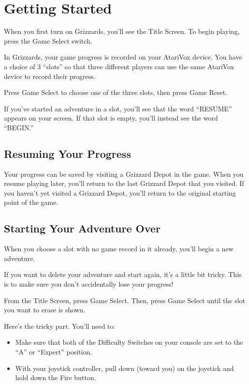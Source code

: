 \documentclass[12pt,twoside]{memoir}
\begin{document}
\chapter{Getting Started}\label{Getting Started}

When you first turn on Grizzards,  you'll see the Title Screen. To begin
playing, press the Game Select switch.

In Grizzards,  your game progress  is recorded on your  AtariVox device.
You have a choice of 3 ``slots'' so that three different players can use
the same AtariVox device to record their progress.

Press  Game  Select  to  choose  one of  the  three  slots,  then  press
Game Reset.

If  you've started  an adventure  in a  slot, you'll  see that  the word
``RESUME'' appears on your screen. If that slot is empty, you'll instead
see the word ``BEGIN.''

\section{Resuming Your Progress}

Your progress  can be saved  by visiting a  Grizzard Depot in  the game.
When you resume playing later, you'll  return to the last Grizzard Depot
that you  visited. If you haven't  yet visited a Grizzard  Depot, you'll
return to the original starting point of the game.

\section{Starting Your Adventure Over}\label{Starting Your Adventure Over}

When you choose a slot with no game record in it already, you'll begin
a new adventure.

If you want to delete your adventure  and start again, it's a little bit
tricky. This is to make sure you don't accidentally lose your progress!

From the Title Screen, press Game  Select. Then, press Game Select until
the slot you want to erase is shown.

Here's the tricky part. You'll need to:

\begin{itemize}
\item Make sure that both of the Difficulty Switches on your console
  are set to the ``A'' or ``Expert'' position.
\item With your joystick controller, pull down (toward you) on the
  joystick and hold down the Fire button.
\end{itemize}
\end{document}

